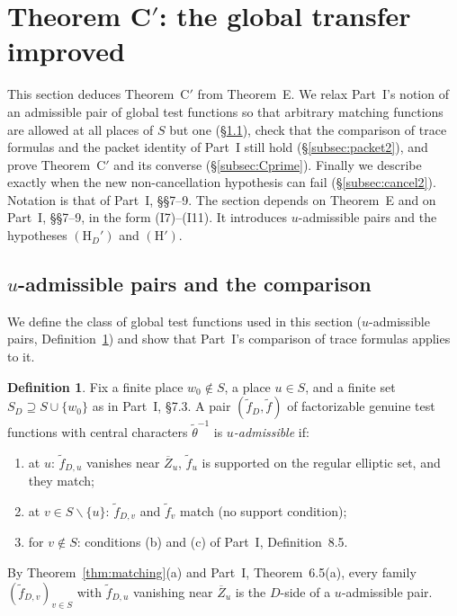 \documentclass[12pt]{article}
\newcommand{\ov}[1]{\overline{#1}}
\newcommand{\Zb}{\ov{Z}}
\theoremstyle{plain}
\theoremstyle{definition}
\newtheorem{definition}[theorem]{Definition}
\begin{document}
\section{Theorem C$'$: the global transfer improved}\label{sec:CC}
This section deduces Theorem~C$'$ from Theorem~E. We relax Part~I's notion of an admissible pair of global test functions so that arbitrary matching functions are allowed at all places of $S$ but one (\S\ref{subsec:uadm}), check that the comparison of trace formulas and the packet identity of Part~I still hold (\S\ref{subsec:packet2}), and prove Theorem~C$'$ and its converse (\S\ref{subsec:Cprime}). Finally we describe exactly when the new non-cancellation hypothesis can fail (\S\ref{subsec:cancel2}). Notation is that of Part~I, \S\S7--9. The section depends on Theorem~E and on Part~I, \S\S7--9, in the form (I7)--(I11). It introduces $u$-admissible pairs and the hypotheses $(\mathrm H_D')$ and $(\mathrm H')$.

\subsection{$u$-admissible pairs and the comparison}\label{subsec:uadm}
We define the class of global test functions used in this section ($u$-admissible pairs, Definition~\ref{def:uadm}) and show that Part~I's comparison of trace formulas applies to it.

\begin{definition}\label{def:uadm}
Fix a finite place $w_0\notin S$, a place $u\in S$, and a finite set $S_D\supseteq S\cup\{w_0\}$ as in Part~I, \S7.3. A pair $(\tilde f_D,\tilde f)$ of factorizable genuine test functions with central characters $\tilde\theta^{-1}$ is \emph{$u$-admissible} if:
\begin{enumerate}[label=(\alph*)]
\item at $u$: $\tilde f_{D,u}$ vanishes near $\Zb_u$, $\tilde f_u$ is supported on the regular elliptic set, and they match;
\item at $v\in S\smallsetminus\{u\}$: $\tilde f_{D,v}$ and $\tilde f_v$ match (no support condition);
\item for $v\notin S$: conditions (b) and (c) of Part~I, Definition~8.5.
\end{enumerate}
\end{definition}

By Theorem~\ref{thm:matching}(a) and Part~I, Theorem~6.5(a), every family $(\tilde f_{D,v})_{v\in S}$ with $\tilde f_{D,u}$ vanishing near $\Zb_u$ is the $D$-side of a $u$-admissible pair.
\end{document}
